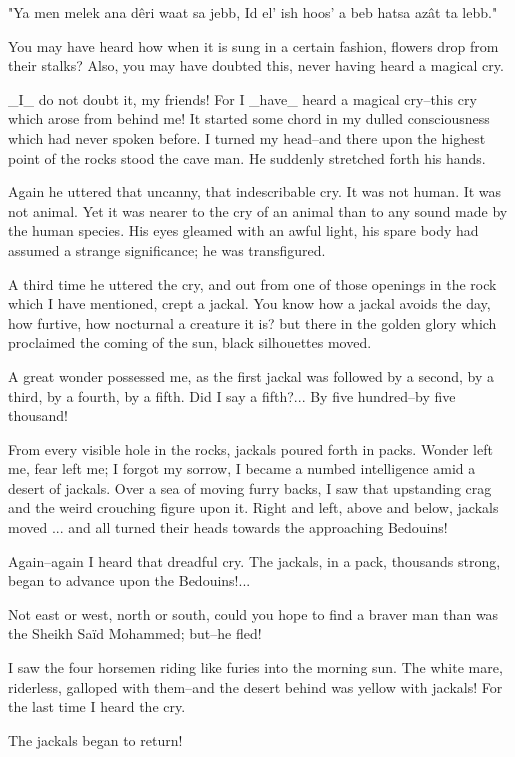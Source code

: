     "Ya men melek ana dêri waat sa jebb,
     Id el' ish hoos' a beb hatsa azât ta lebb."

You may have heard how when it is sung in a certain fashion, flowers
drop from their stalks? Also, you may have doubted this, never having
heard a magical cry.

_I_ do not doubt it, my friends! For I _have_ heard a magical
cry--this cry which arose from behind me! It started some chord in my
dulled consciousness which had never spoken before. I turned my
head--and there upon the highest point of the rocks stood the cave
man. He suddenly stretched forth his hands.

Again he uttered that uncanny, that indescribable cry. It was not
human. It was not animal. Yet it was nearer to the cry of an animal
than to any sound made by the human species. His eyes gleamed with an
awful light, his spare body had assumed a strange significance; he was
transfigured.

A third time he uttered the cry, and out from one of those openings in
the rock which I have mentioned, crept a jackal. You know how a jackal
avoids the day, how furtive, how nocturnal a creature it is? but there
in the golden glory which proclaimed the coming of the sun, black
silhouettes moved.

A great wonder possessed me, as the first jackal was followed by a
second, by a third, by a fourth, by a fifth. Did I say a fifth?...
By five hundred--by five thousand!

From every visible hole in the rocks, jackals poured forth in packs.
Wonder left me, fear left me; I forgot my sorrow, I became a numbed
intelligence amid a desert of jackals. Over a sea of moving furry
backs, I saw that upstanding crag and the weird crouching figure upon
it. Right and left, above and below, jackals moved ... and all turned
their heads towards the approaching Bedouins!

Again--again I heard that dreadful cry. The jackals, in a pack,
thousands strong, began to advance upon the Bedouins!...

Not east or west, north or south, could you hope to find a braver man
than was the Sheikh Saïd Mohammed; but--he fled!

I saw the four horsemen riding like furies into the morning sun. The
white mare, riderless, galloped with them--and the desert behind was
yellow with jackals! For the last time I heard the cry.

The jackals began to return!

